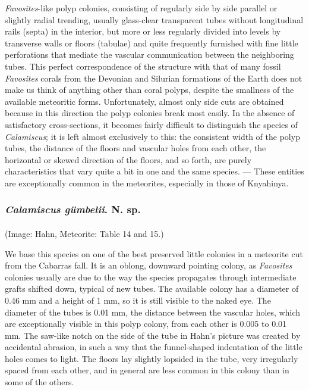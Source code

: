 \documentclass[a4paper, 12pt, oneside]{article}
\begin{document}
\emph{Favosites}-like polyp colonies, consisting of regularly side by side parallel or slightly radial trending, usually glass-clear transparent tubes without longitudinal rails (septa) in the interior, but more or less regularly divided into levels by transverse walls or floors (tabulae) and quite frequently furnished with fine little perforations that mediate the vascular communication between the neighboring tubes. This perfect correspondence of the structure with that of many fossil \emph{Favosites} corals from the Devonian and Silurian formations of the Earth does not make us think of anything other than coral polyps, despite the smallness of the available meteoritic forms. Unfortunately, almost only side cuts are obtained because in this direction the polyp colonies break most easily. In the absence of satisfactory cross-sections, it becomes fairly difficult to distinguish the species of \emph{Calamiscus}; it is left almost exclusively to this: the consistent width of the polyp tubes, the distance of the floors and vascular holes from each other, the horizontal or skewed direction of the floors, and so forth, are purely characteristics that vary quite a bit in one and the same species. --- These entities are exceptionally common in the meteorites, especially in those of Knyahinya.
\subsubsection{\emph{Calamiscus gümbelii}. N. sp.}
\paragraph{}
(Image: Hahn, Meteorite: Table 14 and 15.)

We base this species on one of the best preserved little colonies in a meteorite cut from the Cabarras fall. It is an oblong, downward pointing colony, as \emph{Favosites} colonies usually are due to the way the species propagates through intermediate grafts shifted down, typical of new tubes. The available colony has a diameter of 0.46 mm and a height of 1 mm, so it is still visible to the naked eye. The diameter of the tubes is 0.01 mm, the distance between the vascular holes, which are exceptionally visible in this polyp colony, from each other is 0.005 to 0.01 mm. The saw-like notch on the side of the tube in Hahn's picture was created by accidental abrasion, in such a way that the funnel-shaped indentation of the little holes comes to light. The floors lay slightly lopsided in the tube, very irregularly spaced from each other, and in general are less common in this colony than in some of the others.
\end{document}

